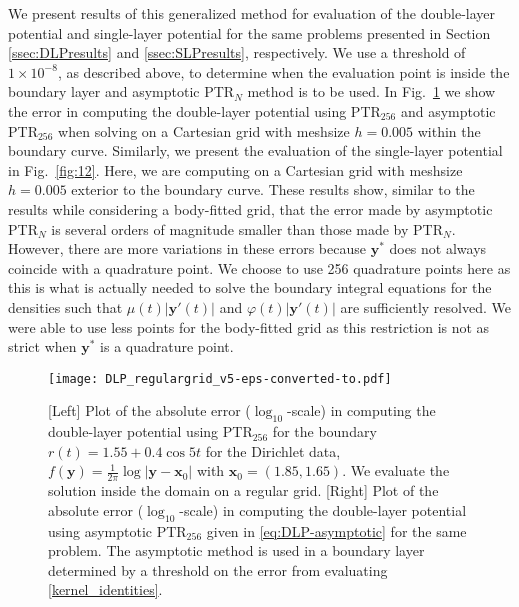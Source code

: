 \documentclass{article}[12pt]
\numberwithin{equation}{section}
\begin{document}
We present results of this generalized method for evaluation of the
double-layer potential and single-layer potential for the same
problems presented in Section \ref{ssec:DLPresults} and
\ref{ssec:SLPresults}, respectively.  We use a threshold of
$1 \times 10^{-8}$, as described above, to determine when the
evaluation point is inside the boundary layer and asymptotic
PTR$_{N}$ method is to be used.  In
{Fig.}~\ref{fig:10} we show the error in computing the double-layer
potential using PTR$_{256}$ and asymptotic
PTR$_{256}$ when solving on a Cartesian grid with
meshsize $h = 0.005$ within the boundary curve.  Similarly, we present
the evaluation of the single-layer potential in
{Fig.}~\ref{fig:12}. Here, we are computing on a Cartesian grid with
meshsize $h = 0.005$ exterior to the boundary curve. These results
show, similar to the results while considering a body-fitted grid,
that the error made by asymptotic PTR$_{N}$ is
several orders of magnitude smaller than those made by
PTR$_{N}$. However, there are more variations in
these errors because $\mathbf{y}^\ast$ does not always coincide with a
quadrature point.  We choose to use 256 quadrature points here as this
is what is actually needed to solve the boundary integral equations
for the densities such that $\mu(t) | \mathbf{y}'(t) |$ and
$\varphi(t) | \mathbf{y}'(t)|$ are sufficiently resolved. We were able
to use less points for the body-fitted grid as this restriction is not
as strict when $\mathbf{y}^\ast$ is a quadrature point.

\begin{figure}[h!]
  \centering
  \texttt{[image: DLP\_regulargrid\_v5-eps-converted-to.pdf]}
  \caption{[Left] Plot of the absolute error
    ($\log_{10}$-scale) in computing the double-layer
    potential using PTR$_{256}$ for the boundary
    $r(t) = {1.55 + 0.4 \cos 5 t }$ for the Dirichlet data,
    $f(\mathbf{y}) = \frac{1}{2\pi} \log | \mathbf{y} - \mathbf{x}_{0}
    |$
    with $\mathbf{x}_{0} = {(1.85, 1.65)}$. We evaluate the solution
    inside the domain on a regular grid.  [Right] Plot of the absolute
    error ($\log_{10}$-scale) in computing the
    double-layer potential using asymptotic
   PTR$_{\text{256}}$ given in
    \eqref{eq:DLP-asymptotic} for the same problem. The asymptotic
    method is used in a boundary layer determined by a threshold on
    the error from evaluating \eqref{kernel_identities}.}
  \label{fig:10}
\end{figure}
\end{document}
